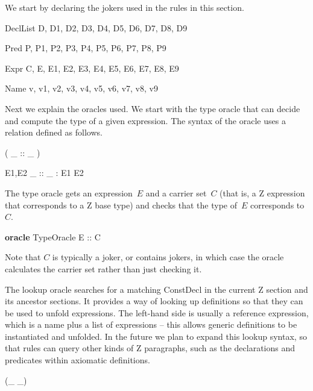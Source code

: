 \documentclass{entcs}
\newenvironment{zedoracle}[1]{\par\textbf{oracle }#1\vspace{-2ex}\infrule}{\endinfrule}
\newcommand{\hasDefn}{\mathrel{hasDefn}}
\begin{document}
We start by declaring the jokers used in the rules in this section.

\begin{zedjoker}{DeclList} D, D1, D2, D3, D4, D5, D6, D7, D8, D9 \end{zedjoker}
\begin{zedjoker}{Pred} P, P1, P2, P3, P4, P5, P6, P7, P8, P9 \end{zedjoker}
\begin{zedjoker}{Expr} C, E, E1, E2, E3, E4, E5, E6, E7, E8, E9 \end{zedjoker}
\begin{zedjoker}{Name} v, v1, v2, v3, v4, v5, v6, v7, v8, v9 \end{zedjoker}

Next we explain the oracles used.  We start with the type oracle that
can decide and compute the type of a given expression.  The syntax of
the oracle uses a relation defined as follows.

\begin{zed}
  \relation ( \_ :: \_ )
\end{zed}

\begin{gendef}{E1,E2}
  \_ :: \_ : E1 \rel E2
\end{gendef}

The type oracle gets an expression~$E$ and a carrier set~$C$ (that is,
a Z expression that corresponds to a Z base type) and checks that the
type of~$E$ corresponds to $C$.

\begin{zedoracle}{TypeOracle}
  E :: C
\end{zedoracle}

Note that $C$ is typically a joker, or contains jokers, in which case
the oracle calculates the carrier set rather than just checking it.

The lookup oracle searches for a matching ConstDecl in the current Z
section and its ancestor sections.  It provides a way of looking up
definitions so that they can be used to unfold expressions.  The
left-hand side is usually a reference expression, which is a name plus
a list of expressions -- this allows generic definitions to be
instantiated and unfolded.  In the future we plan to expand this
lookup syntax, so that rules can query other kinds of Z paragraphs,
such as the declarations and predicates within axiomatic definitions.

\begin{zed}
  \relation (\_ \hasDefn \_)
\end{zed}
\end{document}
